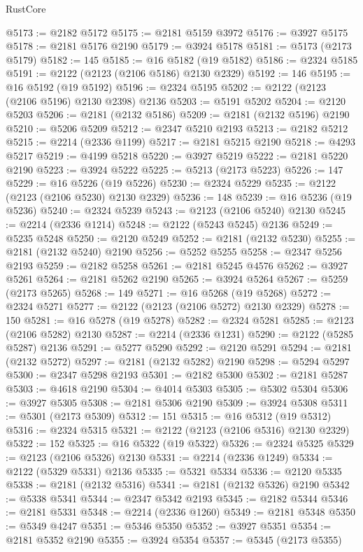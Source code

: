\begin{lexlean}{RustCore}
\begin{coremodule}
@5173 := @2182 @5172
@5175 := @2181 @5159 @3972
@5176 := @3927 @5175
@5178 := @2181 @5176 @2190
@5179 := @3924 @5178
@5181 := @5173 (@2173 @5179)
@5182 := 145
@5185 := @16 @5182 (@19 @5182)
@5186 := @2324 @5185
@5191 := @2122 (@2123 (@2106 @5186) @2130 @2329)
@5192 := 146
@5195 := @16 @5192 (@19 @5192)
@5196 := @2324 @5195
@5202 := @2122 (@2123 (@2106 @5196) @2130 @2398) @2136
@5203 := @5191 @5202
@5204 := @2120 @5203
@5206 := @2181 (@2132 @5186)
@5209 := @2181 (@2132 @5196) @2190
@5210 := @5206 @5209
@5212 := @2347 @5210 @2193
@5213 := @2182 @5212
@5215 := @2214 (@2336 @1199)
@5217 := @2181 @5215 @2190
@5218 := @4293 @5217
@5219 := @4199 @5218
@5220 := @3927 @5219
@5222 := @2181 @5220 @2190
@5223 := @3924 @5222
@5225 := @5213 (@2173 @5223)
@5226 := 147
@5229 := @16 @5226 (@19 @5226)
@5230 := @2324 @5229
@5235 := @2122 (@2123 (@2106 @5230) @2130 @2329)
@5236 := 148
@5239 := @16 @5236 (@19 @5236)
@5240 := @2324 @5239
@5243 := @2123 (@2106 @5240) @2130
@5245 := @2214 (@2336 @1214)
@5248 := @2122 (@5243 @5245) @2136
@5249 := @5235 @5248
@5250 := @2120 @5249
@5252 := @2181 (@2132 @5230)
@5255 := @2181 (@2132 @5240) @2190
@5256 := @5252 @5255
@5258 := @2347 @5256 @2193
@5259 := @2182 @5258
@5261 := @2181 @5245 @4576
@5262 := @3927 @5261
@5264 := @2181 @5262 @2190
@5265 := @3924 @5264
@5267 := @5259 (@2173 @5265)
@5268 := 149
@5271 := @16 @5268 (@19 @5268)
@5272 := @2324 @5271
@5277 := @2122 (@2123 (@2106 @5272) @2130 @2329)
@5278 := 150
@5281 := @16 @5278 (@19 @5278)
@5282 := @2324 @5281
@5285 := @2123 (@2106 @5282) @2130
@5287 := @2214 (@2336 @1231)
@5290 := @2122 (@5285 @5287) @2136
@5291 := @5277 @5290
@5292 := @2120 @5291
@5294 := @2181 (@2132 @5272)
@5297 := @2181 (@2132 @5282) @2190
@5298 := @5294 @5297
@5300 := @2347 @5298 @2193
@5301 := @2182 @5300
@5302 := @2181 @5287
@5303 := @4618 @2190
@5304 := @4014 @5303
@5305 := @5302 @5304
@5306 := @3927 @5305
@5308 := @2181 @5306 @2190
@5309 := @3924 @5308
@5311 := @5301 (@2173 @5309)
@5312 := 151
@5315 := @16 @5312 (@19 @5312)
@5316 := @2324 @5315
@5321 := @2122 (@2123 (@2106 @5316) @2130 @2329)
@5322 := 152
@5325 := @16 @5322 (@19 @5322)
@5326 := @2324 @5325
@5329 := @2123 (@2106 @5326) @2130
@5331 := @2214 (@2336 @1249)
@5334 := @2122 (@5329 @5331) @2136
@5335 := @5321 @5334
@5336 := @2120 @5335
@5338 := @2181 (@2132 @5316)
@5341 := @2181 (@2132 @5326) @2190
@5342 := @5338 @5341
@5344 := @2347 @5342 @2193
@5345 := @2182 @5344
@5346 := @2181 @5331
@5348 := @2214 (@2336 @1260)
@5349 := @2181 @5348
@5350 := @5349 @4247
@5351 := @5346 @5350
@5352 := @3927 @5351
@5354 := @2181 @5352 @2190
@5355 := @3924 @5354
@5357 := @5345 (@2173 @5355)

\end{coremodule}
\end{lexlean}
